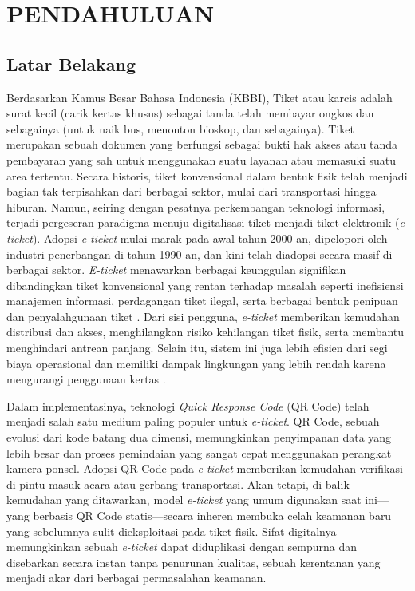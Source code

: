 \chapter{PENDAHULUAN}
\label{chap:pendahuluan}
\section{Latar Belakang}

Berdasarkan Kamus Besar Bahasa Indonesia (KBBI), Tiket atau karcis adalah surat kecil (carik kertas khusus) sebagai tanda telah membayar ongkos dan sebagainya (untuk naik bus, menonton bioskop, dan sebagainya). Tiket merupakan sebuah dokumen yang berfungsi sebagai bukti hak akses atau tanda pembayaran yang sah untuk menggunakan suatu layanan atau memasuki suatu area tertentu. Secara historis, tiket konvensional dalam bentuk fisik telah menjadi bagian tak terpisahkan dari berbagai sektor, mulai dari transportasi hingga hiburan. Namun, seiring dengan pesatnya perkembangan teknologi informasi, terjadi pergeseran paradigma menuju digitalisasi tiket menjadi tiket elektronik (\textit{e-ticket}). Adopsi \textit{e-ticket} mulai marak pada awal tahun 2000-an, dipelopori oleh industri penerbangan di tahun 1990-an, dan kini telah diadopsi secara masif di berbagai sektor. \textit{E-ticket} menawarkan berbagai keunggulan signifikan dibandingkan tiket konvensional yang rentan terhadap masalah seperti inefisiensi manajemen informasi, perdagangan tiket ilegal, serta berbagai bentuk penipuan dan penyalahgunaan tiket \cite{lubeck2012electronic}. Dari sisi pengguna, \textit{e-ticket} memberikan kemudahan distribusi dan akses, menghilangkan risiko kehilangan tiket fisik, serta membantu menghindari antrean panjang. Selain itu, sistem ini juga lebih efisien dari segi biaya operasional dan memiliki dampak lingkungan yang lebih rendah karena mengurangi penggunaan kertas \cite{chen2007passenger}.

Dalam implementasinya, teknologi \textit{Quick Response Code} (QR Code) telah menjadi salah satu medium paling populer untuk \textit{e-ticket}. QR Code, sebuah evolusi dari kode batang dua dimensi, memungkinkan penyimpanan data yang lebih besar dan proses pemindaian yang sangat cepat menggunakan perangkat kamera ponsel. Adopsi QR Code pada \textit{e-ticket} memberikan kemudahan verifikasi di pintu masuk acara atau gerbang transportasi. Akan tetapi, di balik kemudahan yang ditawarkan, model \textit{e-ticket} yang umum digunakan saat ini---yang berbasis QR Code statis---secara inheren membuka celah keamanan baru yang sebelumnya sulit dieksploitasi pada tiket fisik. Sifat digitalnya memungkinkan sebuah \textit{e-ticket} dapat diduplikasi dengan sempurna dan disebarkan secara instan tanpa penurunan kualitas, sebuah kerentanan yang menjadi akar dari berbagai permasalahan keamanan.

